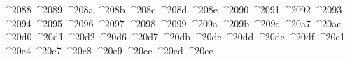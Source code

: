 {  ^^^^2088%
  ^^^^2089%
  ^^^^208a%
  ^^^^208b%
  ^^^^208c%
  ^^^^208d%
  ^^^^208e%
  ^^^^2090%
  ^^^^2091%
  ^^^^2092%
  ^^^^2093%
  ^^^^2094%
  ^^^^2095%
  ^^^^2096%
  ^^^^2097%
  ^^^^2098%
  ^^^^2099%
  ^^^^209a%
  ^^^^209b%
  ^^^^209c%
  ^^^^20a7%
  ^^^^20ac%
  ^^^^20d0%
  ^^^^20d1%
  ^^^^20d2%
  ^^^^20d6%
  ^^^^20d7%
  ^^^^20db%
  ^^^^20dc%
  ^^^^20dd%
  ^^^^20de%
  ^^^^20df%
  ^^^^20e1%
  ^^^^20e4%
  ^^^^20e7%
  ^^^^20e8%
  ^^^^20e9%
  ^^^^20ec%
  ^^^^20ed%
  ^^^^20ee%
}
